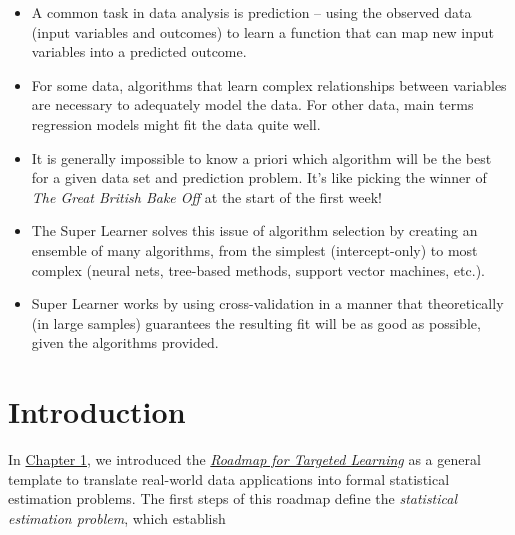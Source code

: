 \documentclass[
  12pt, krantz2,
]{krantz}
\providecommand{\tightlist}{%
  \setlength{\itemsep}{0pt}\setlength{\parskip}{0pt}}
\theoremstyle{definition}
\theoremstyle{definition}
\theoremstyle{definition}
\newcommand{\1}{\mathbbm{1}}
\begin{document}
\begin{itemize}
\tightlist
\item
  A common task in data analysis is prediction -- using the observed data (input
  variables and outcomes) to learn a function that can map new input variables
  into a predicted outcome.
\item
  For some data, algorithms that learn complex relationships between variables
  are necessary to adequately model the data. For other data, main terms
  regression models might fit the data quite well.
\item
  It is generally impossible to know a priori which algorithm will be the best
  for a given data set and prediction problem. It's like picking the winner of
  \emph{The Great British Bake Off} at the start of the first week!
\item
  The Super Learner solves this issue of algorithm selection by creating an
  ensemble of many algorithms, from the simplest (intercept-only) to most
  complex (neural nets, tree-based methods, support vector machines, etc.).
\item
  Super Learner works by using cross-validation in a manner that theoretically
  (in large samples) guarantees the resulting fit will be as good as possible,
  given the algorithms provided.
\end{itemize}

\hypertarget{introduction-2}{%
\section{Introduction}\label{introduction-2}}

In \protect\hyperlink{intro}{Chapter 1}, we introduced the \protect\hyperlink{roadmap}{\emph{Roadmap for Targeted
Learning}} as a general template to translate real-world data
applications into formal statistical estimation problems. The first steps of
this roadmap define the \emph{statistical estimation problem}, which establish
\end{document}
